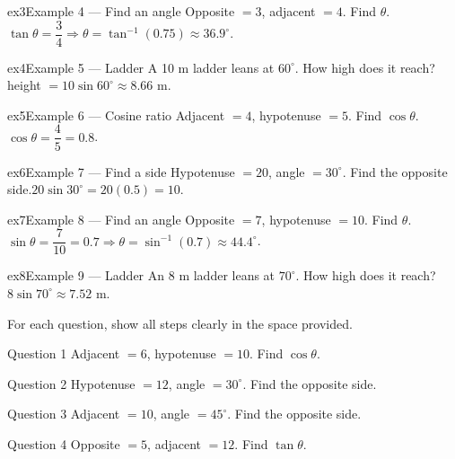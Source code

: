 \documentclass[11pt]{article}
\begin{document}
\begin{example}{ex3}{Example 4 --- Find an angle}
Opposite $=3$, adjacent $=4$. Find $\theta$.\soln $\tan\theta=\dfrac34\Rightarrow\theta=\tan^{-1}(0.75)\approx36.9^\circ$.
\end{example}

\begin{example}{ex4}{Example 5 --- Ladder}
A 10 m ladder leans at $60^\circ$. How high does it reach?\soln height $=10\sin60^\circ\approx8.66$ m.
\end{example}

\begin{example}{ex5}{Example 6 --- Cosine ratio}
Adjacent $=4$, hypotenuse $=5$. Find $\cos\theta$.\soln $\cos\theta=\dfrac45=0.8$.
\end{example}

\begin{example}{ex6}{Example 7 --- Find a side}
Hypotenuse $=20$, angle $=30^\circ$. Find the opposite side.\soln $20\sin30^\circ=20(0.5)=10$.
\end{example}

\begin{example}{ex7}{Example 8 --- Find an angle}
Opposite $=7$, hypotenuse $=10$. Find $\theta$.\soln $\sin\theta=\dfrac{7}{10}=0.7\Rightarrow\theta=\sin^{-1}(0.7)\approx44.4^\circ$.
\end{example}

\begin{example}{ex8}{Example 9 --- Ladder}
An 8 m ladder leans at $70^\circ$. How high does it reach?\soln $8\sin70^\circ\approx7.52$ m.
\end{example}

\clearpage
{}
For each question, show all steps clearly in the space provided.

\begin{qbox}{Question 1}
Adjacent $=6$, hypotenuse $=10$. Find $\cos\theta$.\workspace{2.4cm}
\end{qbox}

\begin{qbox}{Question 2}
Hypotenuse $=12$, angle $=30^\circ$. Find the opposite side.\workspace{2.4cm}
\end{qbox}

\begin{qbox}{Question 3}
Adjacent $=10$, angle $=45^\circ$. Find the opposite side.\workspace{2.4cm}
\end{qbox}

\begin{qbox}{Question 4}
Opposite $=5$, adjacent $=12$. Find $\tan\theta$.\workspace{2.4cm}
\end{qbox}
\end{document}
